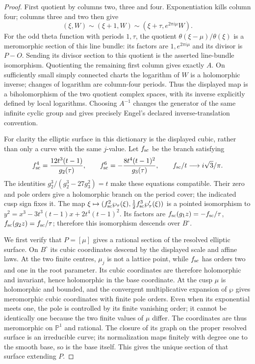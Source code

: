 \begin{proof}
First quotient by columns two, three and four. Exponentiation kills column four; columns three and two then give
\[
 (\xi,W)\sim(\xi+1,W)\sim(\xi+\tau,e^{2\pi i\mu}W).
\]
For the odd theta function with periods $1,\tau$, the quotient $\theta(\xi-\mu)/\theta(\xi)$ is a meromorphic section of this line bundle: its factors are $1,e^{2\pi i\mu}$ and its divisor is $P-O$. Sending its divisor section to this quotient is the asserted line-bundle isomorphism. Quotienting the remaining first column gives exactly $A$. On sufficiently small simply connected charts the logarithm of $W$ is a holomorphic inverse; changes of logarithm are column-four periods. Thus the displayed map is a biholomorphism of the two quotient complex spaces, with its inverse explicitly defined by local logarithms. Choosing $A^{-1}$ changes the generator of the same infinite cyclic group and gives precisely Engel's declared inverse-translation convention.

For clarity the elliptic surface in this dictionary is the displayed cubic, rather than only a curve with the same $j$-value. Let $f_{\rm sc}$ be the branch satisfying
\[
 f_{\rm sc}^4=\frac{12t^3(t-1)}{g_2(\tau)},\qquad
 f_{\rm sc}^6=-\frac{8t^4(t-1)^2}{g_3(\tau)},\qquad
 f_{\rm sc}/t\longrightarrow i\sqrt3/\pi.
\]
The identities $g_2^3/(g_2^3-27g_3^2)=t$ make these equations compatible. Their zero and pole orders give a holomorphic branch on the period cover; the indicated cusp sign fixes it. The map $\xi\mapsto(f_{\rm sc}^2\wp_\tau(\xi),\frac12f_{\rm sc}^3\wp'_\tau(\xi))$ is a pointed isomorphism to
$y^2=x^3-3t^3(t-1)x+2t^4(t-1)^2$. Its factors are $f_{\rm sc}(g_1z)=-f_{\rm sc}/\tau$, $f_{\rm sc}(g_2z)=f_{\rm sc}/\tau$; therefore this isomorphism descends over $B^\circ$.

We first verify that $P=[\mu]$ gives a rational section of the resolved elliptic surface. On $B^\circ$ its cubic coordinates descend by the displayed scale and affine laws. At the two finite centres, $\mu_j$ is not a lattice point, while $f_{\rm sc}$ has orders two and one in the root parameter. Its cubic coordinates are therefore holomorphic and invariant, hence holomorphic in the base coordinate. At the cusp $\mu$ is holomorphic and bounded, and the convergent multiplicative expansion of $\wp$ gives meromorphic cubic coordinates with finite pole orders. Even when its exponential meets one, the pole is controlled by its finite vanishing order; it cannot be identically one because the two finite values of $\mu$ differ. The coordinates are thus meromorphic on $\mathbb P^1$ and rational. The closure of its graph on the proper resolved surface is an irreducible curve; its normalization maps finitely with degree one to the smooth base, so is the base itself. This gives the unique section of that surface extending $P$.


\end{proof}
